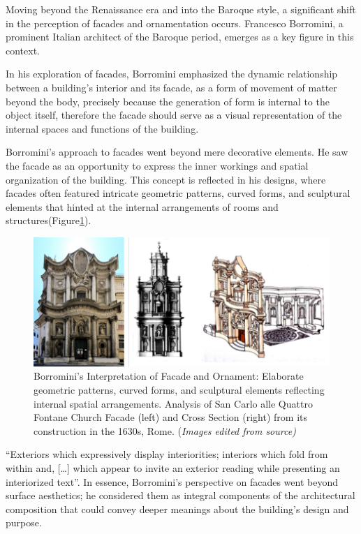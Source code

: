 Moving beyond the Renaissance era and into the Baroque style, a significant shift in the perception of facades and ornamentation occurs.
Francesco Borromini, a prominent Italian architect of the Baroque period, emerges as a key figure in this context.

In his exploration of facades, Borromini emphasized the dynamic relationship between a building's interior and its facade, as a form of movement of matter beyond the body, precisely because the generation of form is internal to the object itself\cite{Benjamin2006}, therefore the facade should serve as a visual representation of the internal spaces and functions of the building.

Borromini's approach to facades went beyond mere decorative elements.
He saw the facade as an opportunity to express the inner workings and spatial organization of the building.
This concept is reflected in his designs, where facades often featured intricate geometric patterns, curved forms, and sculptural elements that hinted at the internal arrangements of rooms and structures(Figure\ref{fig:BorrominiArchitecture}).

     \begin{figure}[htb]
          \centering
          \includegraphics[width= \linewidth]{Images/BaroquefacadeBorromini}
          \caption{Borromini's Interpretation of Facade and Ornament: Elaborate geometric patterns, curved forms, and sculptural elements reflecting internal spatial arrangements. Analysis of San Carlo alle Quattro Fontane Church Facade (left) and Cross Section (right) from its construction in the 1630s, Rome. (\textit{Images edited from source)}}
          \label{fig:BorrominiArchitecture}
        \end{figure}

``Exteriors which expressively display interiorities;
interiors which fold from within and, [\ldots] which appear to invite an exterior reading while presenting an interiorized text''\cite{Biglieri2004}.
In essence, Borromini's perspective on facades went beyond surface aesthetics;
he considered them as integral components of the architectural composition that could convey deeper meanings about the building's design and purpose.

